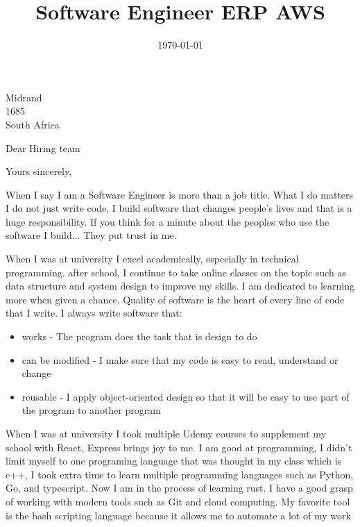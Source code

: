 \documentclass[11pt,a4paper,roman]{moderncv}        %
\title{Software Engineer ERP AWS}                               %
\begin{document}
 {Midrand \\ 1685 \\ South Africa}
\date{\today}

\makeatletter
\renewcommand*{\makeletterclosing}{
  \@closing\\%
  {\bfseries\@firstname~\@lastname}%
  \ifthenelse{\isundefined{\@enclosure}}{}{%
    \\%
    \vfil%
    {\color{color2}\itshape\enclname: \@enclosure}}%
    \vfil}
\makeatother


\opening{Dear Hiring team}

\closing{Yours sincerely,}

\makelettertitle

When I say I am a Software Engineer is more than a job title. What I do matters
I do not just write code, I build software that changes people's lives and that
is a huge responsibility. If you think for a minute about the peoples who use
the software I build... They put trust in me.

When I was at university I excel
academically, especially in technical programming. after school, I continue to
take online classes on the topic such as data structure and system design to
improve my skills. I am dedicated to learning more when given a chance.
Quality of software is the heart of every line of code that I write. I always
write software that: 
\begin{itemize}
  \item works - The program does the task that is design to do
  \item can be modified - I make sure that my code is easy to read, understand or change
  \item reusable - I apply object-oriented design so that it will be easy to use part of the program to another program 
\end{itemize}

When I was at university I took multiple Udemy courses to supplement my school
with React, Express brings joy to me.
I am good at programming, I didn't limit myself to one programing language that 
was thought in my class which is c++,  I took extra time to learn multiple 
programming languages such as Python, Go, and typescript. Now I am in the process of
learning rust. I have a good grasp of working with modern tools such as Git and
cloud computing. My favorite tool is the bash scripting language because it
allows me to automate a lot of my work
\end{document}

